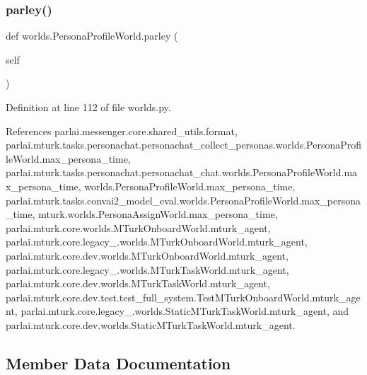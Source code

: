 \subsubsection{\texorpdfstring{parley()}{parley()}}
{\footnotesize\ttfamily def worlds.\+Persona\+Profile\+World.\+parley (\begin{DoxyParamCaption}\item[{}]{self }\end{DoxyParamCaption})}



Definition at line 112 of file worlds.\+py.



References parlai.\+messenger.\+core.\+shared\+\_\+utils.\+format, parlai.\+mturk.\+tasks.\+personachat.\+personachat\+\_\+collect\+\_\+personas.\+worlds.\+Persona\+Profile\+World.\+max\+\_\+persona\+\_\+time, parlai.\+mturk.\+tasks.\+personachat.\+personachat\+\_\+chat.\+worlds.\+Persona\+Profile\+World.\+max\+\_\+persona\+\_\+time, worlds.\+Persona\+Profile\+World.\+max\+\_\+persona\+\_\+time, parlai.\+mturk.\+tasks.\+convai2\+\_\+model\+\_\+eval.\+worlds.\+Persona\+Profile\+World.\+max\+\_\+persona\+\_\+time, mturk.\+worlds.\+Persona\+Assign\+World.\+max\+\_\+persona\+\_\+time, parlai.\+mturk.\+core.\+worlds.\+M\+Turk\+Onboard\+World.\+mturk\+\_\+agent, parlai.\+mturk.\+core.\+legacy\+\_.\+worlds.\+M\+Turk\+Onboard\+World.\+mturk\+\_\+agent, parlai.\+mturk.\+core.\+dev.\+worlds.\+M\+Turk\+Onboard\+World.\+mturk\+\_\+agent, parlai.\+mturk.\+core.\+legacy\+\_.\+worlds.\+M\+Turk\+Task\+World.\+mturk\+\_\+agent, parlai.\+mturk.\+core.\+dev.\+worlds.\+M\+Turk\+Task\+World.\+mturk\+\_\+agent, parlai.\+mturk.\+core.\+dev.\+test.\+test\+\_\+full\+\_\+system.\+Test\+M\+Turk\+Onboard\+World.\+mturk\+\_\+agent, parlai.\+mturk.\+core.\+legacy\+\_.\+worlds.\+Static\+M\+Turk\+Task\+World.\+mturk\+\_\+agent, and parlai.\+mturk.\+core.\+dev.\+worlds.\+Static\+M\+Turk\+Task\+World.\+mturk\+\_\+agent.



\subsection{Member Data Documentation}
\mbox{\label{classworlds_1_1PersonaProfileWorld_a43d9f2070cf88d0a1462e2b35b86b513}} 
